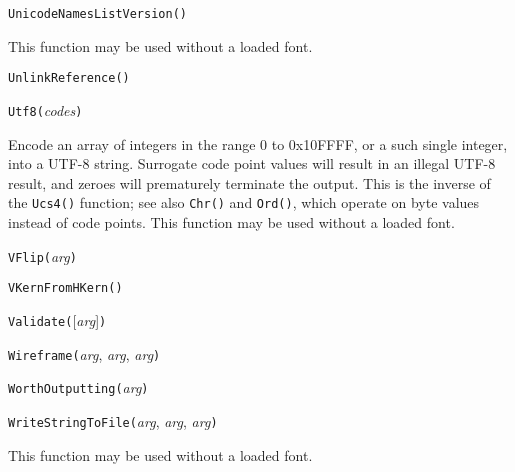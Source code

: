 
\texttt{UnicodeNamesListVersion(}\texttt{)}

This function may be used without a loaded font.



\texttt{UnlinkReference(}\texttt{)}



\texttt{Utf8(}\textit{codes}\texttt{)}

Encode an array of integers in the range 0 to 0x10FFFF, or a such single
integer, into a UTF-8 string.  Surrogate code point values will result in
an illegal UTF-8 result, and zeroes will prematurely terminate the output. 
This is the inverse of the \texttt{Ucs4()} function; see also \texttt{Chr()}
and \texttt{Ord()}, which operate on byte values instead of code points. 
This function may be used without a loaded font.



\texttt{VFlip(}\textit{arg}\texttt{)}



\texttt{VKernFromHKern(}\texttt{)}



\texttt{Validate(}[\textit{arg}]\texttt{)}



\texttt{Wireframe(}\textit{arg}, \textit{arg}, \textit{arg}\texttt{)}



\texttt{WorthOutputting(}\textit{arg}\texttt{)}



\texttt{WriteStringToFile(}\textit{arg}, \textit{arg}, \textit{arg}\texttt{)}

This function may be used without a loaded font.

